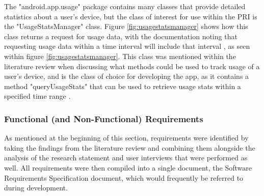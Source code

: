 \documentclass[12pt]{article}
\begin{document}
The "android.app.usage" package contains many classes that provide detailed statistics about a user's device, but the class of interest for use within the PRI is the "UsageStatsManager" 
class. Figure \ref{fig:usagestatsmanager} shows how this class returns a request for usage data, with the documentation noting that requesting usage data within a time interval will include that
interval \autocite{androiddevelopment-usagestatsmanager}, as seen within figure \ref{fig:usagestatsmanager}. This class was mentioned within the literature review when discussing what methods could 
be used to track usage of a user's device, and is the class of choice for developing the app, as it contains a method "queryUsageStats" that can be used to retrieve usage stats within a specified 
time range \autocite{androiddevelopment-usagestatsmanager}.

\subsubsection{Functional (and Non-Functional) Requirements}

As mentioned at the beginning of this section, requirements were identified by taking the findings from the literature review and combining them alongside the analysis of the research statement and
user interviews that were performed as well. All requirements were then compiled into a single document, the Software Requirements Specification document, which would frequently be referred to during
development.
\end{document}
